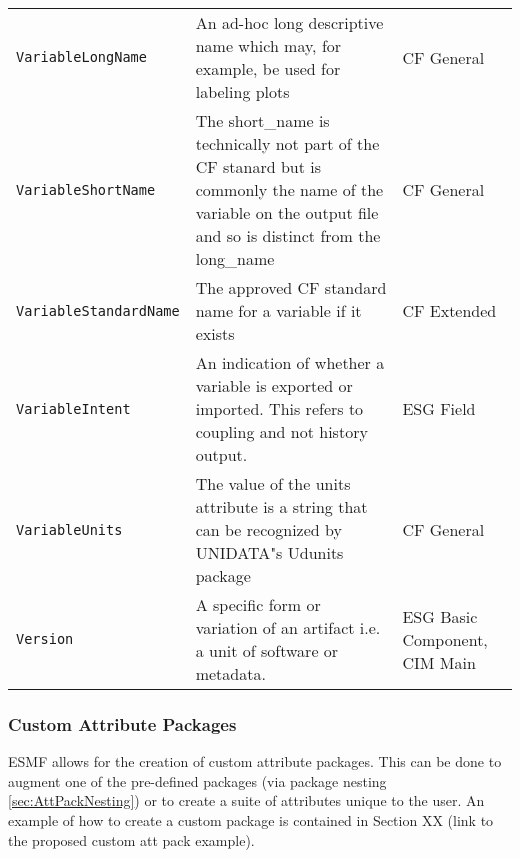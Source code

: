 \begin{tabular}{|p{8cm}|p{20cm}|p{10cm}}
     {\tt VariableLongName} & An ad-hoc long descriptive name which may, for example, be used for labeling plots & CF General\\
     {\tt VariableShortName}  & The short\_name is technically not part of the CF stanard but is commonly the name of the variable on the output file and so is distinct from the long\_name & CF General\\
     {\tt VariableStandardName} & The approved CF standard name for a variable if it exists &  CF Extended\\
     {\tt VariableIntent} & An indication of whether a variable is exported or imported. This refers to coupling and not history output. & ESG Field\\
     {\tt VariableUnits}  & The value of the units attribute is a string that can be recognized by UNIDATA"s Udunits package & CF General\\
     {\tt Version} & A specific form or variation of an artifact i.e. a unit of software or metadata. & ESG Basic Component, CIM Main\\ 

\end{tabular}

\vspace{.20in}




\subsubsection{Custom Attribute Packages}
\label{sec:CustomAttPacks}

ESMF allows for the creation of custom attribute packages. This can be done to augment one of the pre-defined packages (via package nesting \ref{sec:AttPackNesting}) or to create a suite of 
attributes unique to the user. An example of how to create a custom package is contained in Section XX (link to the proposed custom att pack example).
